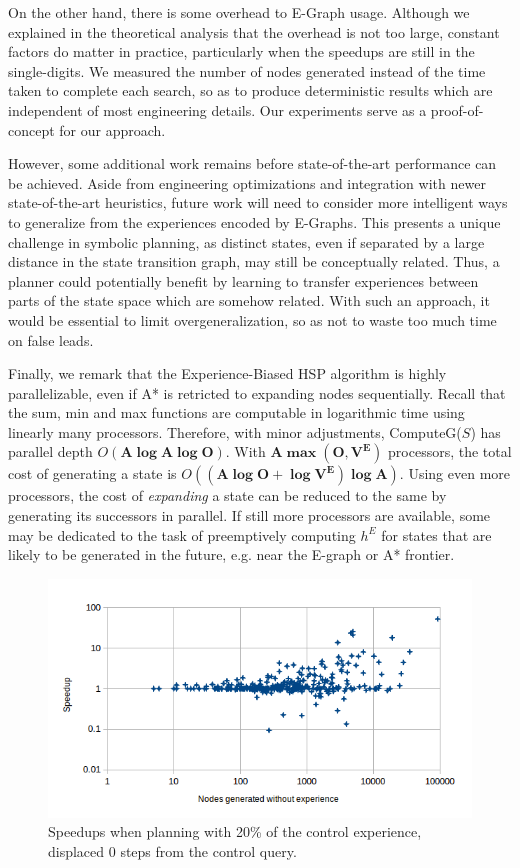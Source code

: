\documentclass[letterpaper]{article}
\begin{document}
On the other hand, there is some overhead to E-Graph usage.
Although we explained in the theoretical analysis that the overhead is not too large, constant factors do matter in practice, particularly when the speedups are still in the single-digits.
We measured the number of nodes generated instead of the time taken to complete each search, so as to produce deterministic results which are independent of most engineering details.
Our experiments serve as a proof-of-concept for our approach.

However, some additional work remains before state-of-the-art performance can be achieved.
Aside from engineering optimizations and integration with newer state-of-the-art heuristics, future work will need to consider more intelligent ways to generalize from the experiences encoded by E-Graphs.
This presents a unique challenge in symbolic planning, as distinct states, even if separated by a large distance in the state transition graph, may still be conceptually related.
Thus, a planner could potentially benefit by learning to transfer experiences between parts of the state space which are somehow related.
With such an approach, it would be essential to limit overgeneralization, so as not to waste too much time on false leads.

Finally, we remark that the Experience-Biased HSP algorithm is highly parallelizable, even if A* is retricted to expanding nodes sequentially. Recall that the sum, min and max functions are computable in logarithmic time using linearly many processors. Therefore, with minor adjustments, ComputeG($S$) has parallel depth $O(\mathbf{A\log A\log O})$. With $\mathbf{A\max(O,V^E)}$ processors, the total cost of generating a state is $O(\mathbf{(A\log O + \log V^E)\log A})$. Using even more processors, the cost of \textit{expanding} a state can be reduced to the same by generating its successors in parallel. If still more processors are available, some may be dedicated to the task of preemptively computing $h^E$ for states that are likely to be generated in the future, e.g. near the E-graph or A* frontier.

\begin{figure}
	\centering
	\includegraphics[scale=0.5]{Speedup_20_0.png}
	\caption{Speedups when planning with 20\% of the control experience, displaced 0 steps from the control query.}
	 \label{fig:s_20_0}
\end{figure}
\end{document}
